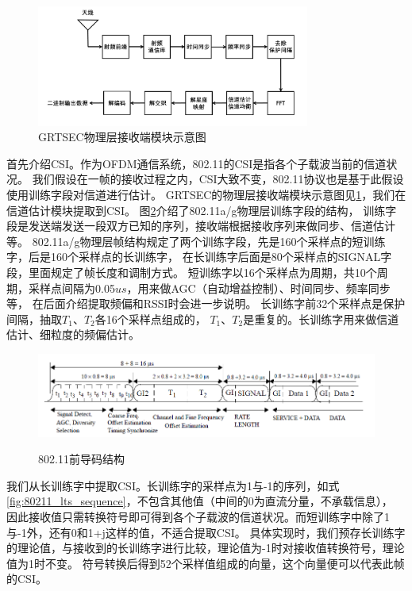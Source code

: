 			\begin{figure}
				\centering
				\includegraphics[width=0.8\textwidth]{img/GRT_phy_rx.png}
				\caption{GRTSEC物理层接收端模块示意图}
				\label{fig:GRT_phy_rx}
			\end{figure}

		首先介绍CSI。作为OFDM通信系统，802.11的CSI是指各个子载波当前的信道状况。
		我们假设在一帧的接收过程之内，CSI大致不变，802.11协议也是基于此假设使用训练字段对信道进行估计。
		GRTSEC的物理层接收端模块示意图见\ref{fig:GRT_phy_rx}，我们在信道估计模块提取到CSI。
		图\ref{fig:80211_spec_preamble}介绍了802.11a/g物理层训练字段的结构，
		训练字段是发送端发送一段双方已知的序列，接收端根据接收序列来做同步、信道估计等。
		802.11a/g物理层帧结构规定了两个训练字段，先是160个采样点的短训练字，后是160个采样点的长训练字，
		在长训练字后面是80个采样点的SIGNAL字段，里面规定了帧长度和调制方式。
		短训练字以16个采样点为周期，共10个周期，采样点间隔为0.05$us$，用来做AGC（自动增益控制）、时间同步、频率同步等，
		在后面介绍提取频偏和RSSI时会进一步说明。
		长训练字前32个采样点是保护间隔，抽取$T_1$、$T_2$各16个采样点组成的，
		$T_1$、$T_2$是重复的。长训练字用来做信道估计、细粒度的频偏估计。
			\begin{figure}
				\centering
				\includegraphics[width=1.0\textwidth]{img/80211_spec_preamble.png}
				\caption{802.11前导码结构}
				\label{fig:80211_spec_preamble}
				\cite{ieee80211}
			\end{figure}

		我们从长训练字中提取CSI。长训练字的采样点为1与-1的序列，如式\ref{fig:80211_lts_sequence}，不包含其他值（中间的0为直流分量，不承载信息），
		因此接收值只需转换符号即可得到各个子载波的信道状况。而短训练字中除了1与-1外，还有0和1+j这样的值，不适合提取CSI。
		具体实现时，我们预存长训练字的理论值，与接收到的长训练字进行比较，理论值为-1时对接收值转换符号，理论值为1时不变。
		符号转换后得到52个采样值组成的向量，这个向量便可以代表此帧的CSI。

